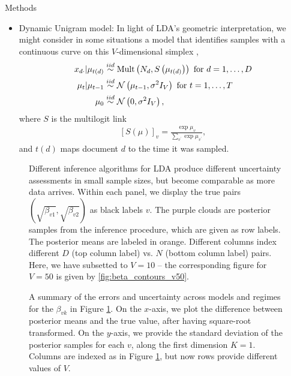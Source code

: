 \documentclass[final]{beamer}
\newlength{\onecolwid}
\begin{document}
\begin{frame}
\begin{columns}
\begin{column}{\onecolwid}
\begin{block}{Methods}
\begin{itemize}
\item Dynamic Unigram model: In light of LDA's geometric interpretation, we
  might consider in some situations a model that identifies samples with a
  continuous curve on this $V$-dimensional simplex \citep{blei2006dynamic},
\begin{align*}
x_{d\cdot} \vert \mu_{t\left(d\right)}  &\overset{iid}{\sim} \textnormal{Mult}\left(N_{d}, S\left(\mu_{t\left(d\right)}\right)\right) \text{ for } d = 1, \dots, D\\
\mu_{t} \vert \mu_{t - 1} &\overset{iid}{\sim} \mathcal{N}\left(\mu_{t - 1}, \sigma^{2}I_{V}\right) \text{ for } t = 1, \dots, T \\
\mu_{0} &\overset{iid}{\sim} \mathcal{N}\left(0, \sigma^{2}I_{V}\right),
\end{align*}
where $S$ is the multilogit link
\begin{align*}
\left[S\left(\mu\right)\right]_{v} = \frac{\exp{\mu_{v}}}{\sum_{v^{\prime}} \exp{\mu_{v^{\prime}}}},
\end{align*}
and $t\left(d\right)$ maps document $d$ to the time it was sampled.
\end{itemize}
\end{block}

\begin{figure}[!p]
  \caption{Different inference algorithms for LDA produce different uncertainty
    assessments in small sample sizes, but become comparable as more data arrives.
    Within each panel, we display the true pairs $\left(\sqrt{\beta_{v1}},
    \sqrt{\beta_{v2}}\right)$ as black labels $v$. The purple clouds are
    posterior samples from the inference procedure, which are given as row labels. The
    posterior means are labeled in orange. Different columns index different $D$
    (top column label) vs. $N$ (bottom column label) pairs. Here, we have
    subsetted to $V = 10$ -- the corresponding figure for $V = 50$ is given by
    \ref{fig:beta_contours_v50}.
  }
  \label{fig:beta_contours_v10}
\end{figure}

\begin{figure}[!p]
  \centering
  \caption{A summary of the errors and uncertainty across models and regimes for
    the $\beta_{vk}$ in Figure \ref{fig:beta_contours_v10}. On the $x$-axis,
    we plot the difference between posterior means and the true value, after
    having square-root transformed. On the $y$-axis, we provide the standard
    deviation of the posterior samples for each $v$, along the first dimension
    $K = 1$. Columns are indexed as in Figure \ref{fig:beta_contours_v10}, but
    now rows provide different values of $V$.
    \label{fig:beta_errors_lda} }
\end{figure}
\end{column}


\end{columns}
\end{frame}
\end{document}

